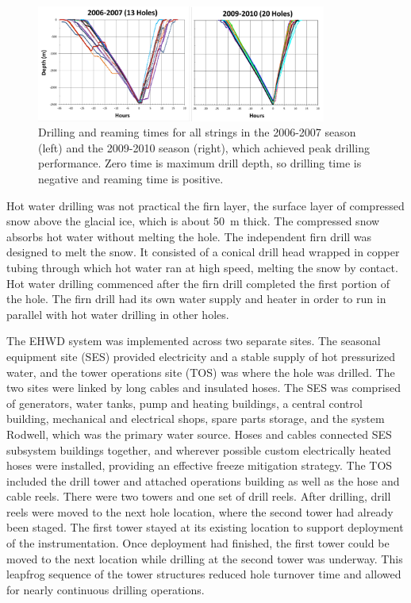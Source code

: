 \begin{figure}[!h]
 \centering
\includegraphics[width=0.85\textwidth]{graphics/drill/drill_depthvtime.pdf}
\caption{Drilling and reaming times for all strings in the 2006-2007 season (left) and the 2009-2010 season (right), which achieved peak drilling performance. Zero time is maximum drill depth, so drilling time is negative and reaming time is positive.}
\label{fig:drilldepthtime}
\end{figure}

Hot water drilling was not practical the firn layer, the surface layer of compressed snow above the glacial ice, which is about 50~m thick. The compressed snow absorbs hot water without melting the hole. The independent firn drill was designed to melt the snow. It consisted of a conical drill head wrapped in copper tubing through which hot water ran at high speed, melting the snow by contact. Hot water drilling commenced after the firn drill completed the first portion of the hole. The firn drill had its own water supply and heater in order to run in parallel with hot water drilling in other holes.

The EHWD system was implemented across two separate sites.  The seasonal equipment site (SES) provided electricity and a stable supply of hot pressurized water, and the tower operations site (TOS) was where the hole was drilled.  The two sites were linked by long cables and insulated hoses. The SES was comprised of generators, water tanks, pump and heating buildings, a central control building, mechanical and electrical shops, spare parts storage, and the system Rodwell, which was the primary water source. Hoses and cables connected SES subsystem buildings together, and wherever possible custom electrically heated hoses were installed, providing an effective freeze mitigation strategy. The TOS included the drill tower and attached operations building as well as the hose and cable reels.  There were two towers and one set of drill reels.  After drilling, drill reels were moved to the next hole location, where the second tower had already been staged.  The first tower stayed at its existing location to support deployment of the instrumentation.  Once deployment had finished, the first tower could be moved to the next location while drilling at the second tower was underway.  This leapfrog sequence of the tower structures reduced hole turnover time and allowed for nearly continuous drilling operations.

